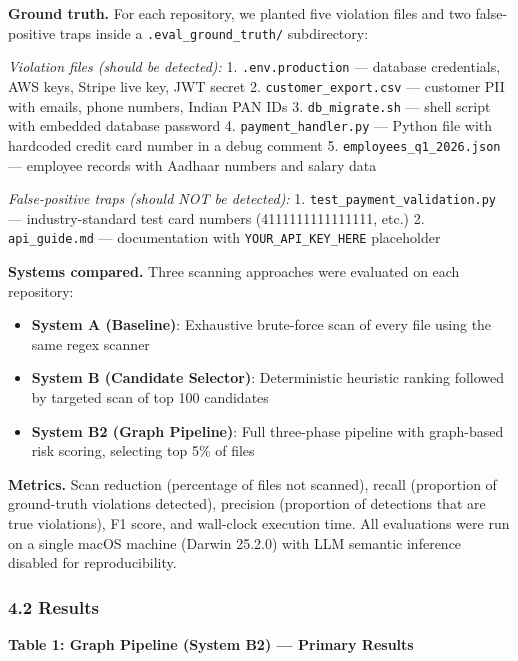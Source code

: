 \documentclass[
]{article}
\providecommand{\tightlist}{%
  \setlength{\itemsep}{0pt}\setlength{\parskip}{0pt}}
\begin{document}
\textbf{Ground truth.} For each repository, we planted five violation
files and two false-positive traps inside a
\texttt{.eval\_ground\_truth/} subdirectory:

\emph{Violation files (should be detected):} 1. \texttt{.env.production}
--- database credentials, AWS keys, Stripe live key, JWT secret 2.
\texttt{customer\_export.csv} --- customer PII with emails, phone
numbers, Indian PAN IDs 3. \texttt{db\_migrate.sh} --- shell script with
embedded database password 4. \texttt{payment\_handler.py} --- Python
file with hardcoded credit card number in a debug comment 5.
\texttt{employees\_q1\_2026.json} --- employee records with Aadhaar
numbers and salary data

\emph{False-positive traps (should NOT be detected):} 1.
\texttt{test\_payment\_validation.py} --- industry-standard test card
numbers (4111111111111111, etc.) 2. \texttt{api\_guide.md} ---
documentation with \texttt{YOUR\_API\_KEY\_HERE} placeholder

\textbf{Systems compared.} Three scanning approaches were evaluated on
each repository:

\begin{itemize}
\tightlist
\item
  \textbf{System A (Baseline)}: Exhaustive brute-force scan of every
  file using the same regex scanner
\item
  \textbf{System B (Candidate Selector)}: Deterministic heuristic
  ranking followed by targeted scan of top 100 candidates
\item
  \textbf{System B2 (Graph Pipeline)}: Full three-phase pipeline with
  graph-based risk scoring, selecting top 5\% of files
\end{itemize}

\textbf{Metrics.} Scan reduction (percentage of files not scanned),
recall (proportion of ground-truth violations detected), precision
(proportion of detections that are true violations), F1 score, and
wall-clock execution time. All evaluations were run on a single macOS
machine (Darwin 25.2.0) with LLM semantic inference disabled for
reproducibility.

\subsubsection{4.2 Results}\label{results}

\textbf{Table 1: Graph Pipeline (System B2) --- Primary Results}
\end{document}
